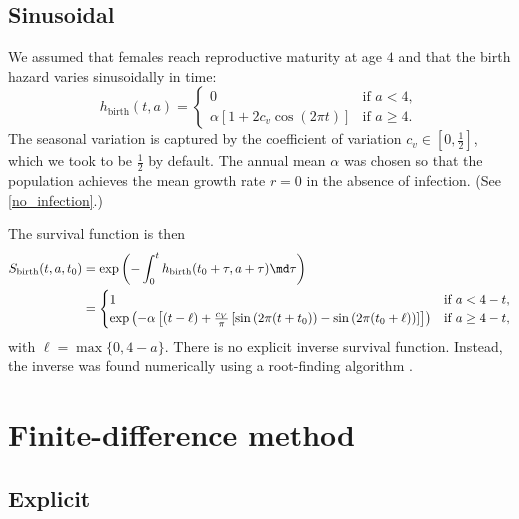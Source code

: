 \documentclass{jpmarticle}
\begin{document}
\subsection{Sinusoidal}

We assumed that females reach reproductive maturity at age $4$ and
that the birth hazard varies sinusoidally in time:
\begin{equation}
  h_{\text{birth}}(t, a) =
  \begin{cases}
    0 & \text{if $a < 4$},
    \\
    \alpha \left[1
      + 2 c_v \cos\left(2 \pi t\right)\right]
    & \text{if $a \geq 4$}.
  \end{cases}
\end{equation}
The seasonal variation is captured by the coefficient of variation
$c_v \in \left[0, \frac{1}{2}\right]$, which we took to be
$\frac{1}{2}$ by default.  The annual mean $\alpha$ was chosen so that
the population achieves the mean growth rate $r = 0$ in the absence of
infection.  (See \autoref{no_infection}.)

The survival function is then
\begin{equation}
  \begin{split}
    S_{\text{birth}}(t, a, t_0) &=
    \exp\left(- \int_0^t h_{\text{birth}}(t_0 + \tau, a + \tau) \md
      \tau\right)
    \\
    &=
    \begin{cases}
      1 & \text{if $a < 4 - t$},
      \\
      \exp\left(- \alpha \left[
          (t - \ell)
          + \frac{c_V}{\pi}
          \left[\sin\left(2 \pi (t + t_0)\right)
            - \sin\left(2 \pi (t_0 + \ell)\right)\right]
        \right]
      \right)
      & \text{if $a \geq 4 - t$},
    \end{cases}
  \end{split}
\end{equation}
with $\ell = \max\{0, 4 - a\}$.  There is no explicit inverse survival
function.  Instead, the inverse was found numerically using a
root-finding algorithm \citep{scipy}.



\section{Finite-difference method}

\subsection{Explicit}
\end{document}
